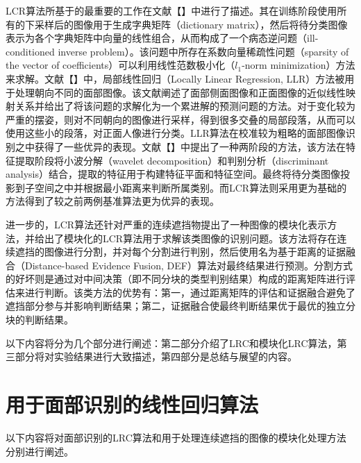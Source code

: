\documentclass[UTF8]{ctexart}
\begin{document}
LCR算法所基于的最重要的工作在文献【】中进行了描述。其在训练阶段使用所有的下采样后的图像用于生成字典矩阵（dictionary matrix），然后将待分类图像表示为各个字典矩阵中向量的线性组合，从而构成了一个病态逆问题（ill-conditioned inverse problem）。该问题中所存在系数向量稀疏性问题（sparsity of the vector of coefficients）可以利用线性范数极小化（\(l_1\)-norm minimization）方法来求解。文献【】中，局部线性回归（Locally Linear Regression, LLR）方法被用于处理朝向不同的面部图像。该文献阐述了面部侧面图像和正面图像的近似线性映射关系并给出了将该问题的求解化为一个累进解的预测问题的方法。对于变化较为严重的摆姿，则对不同朝向的图像进行采样，得到很多交叠的局部段落，从而可以使用这些小的段落，对正面人像进行分类。LLR算法在校准较为粗略的面部图像识别之中获得了一些优异的表现。文献【】中提出了一种两阶段的方法，该方法在特征提取阶段将小波分解（wavelet decomposition）和判别分析（discriminant analysis）结合，提取的特征用于构建特征平面和特征空间。最终将待分类图像投影到子空间之中并根据最小距离来判断所属类别。而LCR算法则采用更为基础的方法得到了较之前两例基准算法更为优异的表现。\par
进一步的，LCR算法还针对严重的连续遮挡物提出了一种图像的模块化表示方法，并给出了模块化的LCR算法用于求解该类图像的识别问题。该方法将存在连续遮挡的图像进行分割，并对每个分割进行判别，然后使用名为基于距离的证据融合（Distance-based Evidence Fusion, DEF）算法对最终结果进行预测。分割方式的好坏则是通过对中间决策（即不同分块的类型判别结果）构成的距离矩阵进行评估来进行判断。该类方法的优势有：第一，通过距离矩阵的评估和证据融合避免了遮挡部分参与并影响判断结果；第二，证据融合使最终判断结果优于最优的独立分块的判断结果。\par
以下内容将分为几个部分进行阐述：第二部分介绍了LRC和模块化LRC算法，第三部分将对实验结果进行大致描述，第四部分是总结与展望的内容。
\section{用于面部识别的线性回归算法}\label{sec-2}
以下内容将对面部识别的LRC算法和用于处理连续遮挡的图像的模块化处理方法分别进行阐述。
\end{document}
